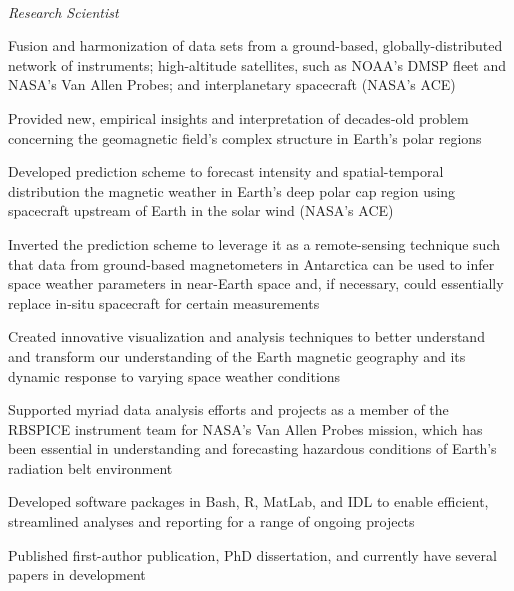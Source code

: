  \\  
\vspace{-0.8em}
\textit{Research Scientist} 
\begin{itemize*}
  \item Fusion and harmonization of data sets from a ground-based,
    globally-distributed network of instruments; high-altitude 
    satellites, such as NOAA's DMSP fleet and NASA's Van Allen
    Probes; and interplanetary spacecraft (NASA's ACE)
  \item Provided new, empirical insights and interpretation of
    decades-old problem concerning the geomagnetic field's complex
    structure in Earth's polar regions
  \item Developed prediction scheme to forecast intensity and
    spatial-temporal distribution the magnetic weather
    in Earth's deep polar cap region using spacecraft upstream of Earth in the
    solar wind (NASA's ACE) 
  \item Inverted the prediction scheme to leverage it as a remote-sensing technique 
    such that data from ground-based magnetometers in Antarctica can
    be used to infer space weather parameters in near-Earth space and,
    if necessary, could essentially replace in-situ spacecraft for certain measurements
  \item Created innovative visualization and analysis techniques
    to better understand and transform our understanding of the 
    Earth magnetic geography and its dynamic response to varying
    space weather conditions
  \item  Supported myriad data analysis efforts and projects as a member
    of the RBSPICE instrument team for NASA's Van Allen
    Probes mission, which has been essential in understanding and
    forecasting hazardous conditions of Earth's radiation belt
    environment
  \item Developed software packages in Bash, R, MatLab, and IDL to enable efficient, 
    streamlined analyses and reporting for a range of ongoing projects 
  \item Published first-author publication, PhD dissertation, and
    currently have several papers in development

\end{itemize*}

